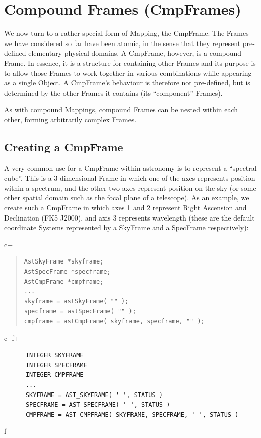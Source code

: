 \documentclass[twoside,11pt]{article}
\begin{document}
\cleardoublepage
\section{\label{ss:cmpframes}Compound Frames (CmpFrames)}

We now turn to a rather special form of Mapping, the CmpFrame. The
Frames we have considered so far have been atomic, in the sense that
they represent pre-defined elementary physical domains. A CmpFrame,
however, is a compound Frame. In essence, it is a structure for
containing other Frames and its purpose is to allow those Frames
to work together in various combinations while appearing as a single
Object. A CmpFrame's behaviour is therefore not pre-defined, but is
determined by the other Frames it contains (its ``component'' Frames).

As with compound Mappings, compound Frames can be nested within each
other, forming arbitrarily complex Frames.

\subsection{Creating a CmpFrame}
A very common use for a CmpFrame within astronomy is to represent a
``spectral cube''. This is a 3-dimensional Frame in which one of the axes
represents position within a spectrum, and the other two axes represent
position on the sky (or some other spatial domain such as the focal plane
of a telescope). As an example, we create such a CmpFrame in which axes
1 and 2 represent Right Ascension and Declination (FK5 J2000), and axis 3 
represents wavelength (these are the default coordinate Systems
represented by a SkyFrame and a SpecFrame respectively):

c+
\begin{quote}
\small
\begin{verbatim}
AstSkyFrame *skyframe;
AstSpecFrame *specframe;
AstCmpFrame *cmpframe;
...
skyframe = astSkyFrame( "" );
specframe = astSpecFrame( "" );
cmpframe = astCmpFrame( skyframe, specframe, "" );
\end{verbatim}
\normalsize
\end{quote}
c-
f+
\small
\begin{verbatim}
      INTEGER SKYFRAME
      INTEGER SPECFRAME
      INTEGER CMPFRAME
      ...
      SKYFRAME = AST_SKYFRAME( ' ', STATUS )
      SPECFRAME = AST_SPECFRAME( ' ', STATUS )
      CMPFRAME = AST_CMPFRAME( SKYFRAME, SPECFRAME, ' ', STATUS )
\end{verbatim}
\normalsize
f-
\end{document}
